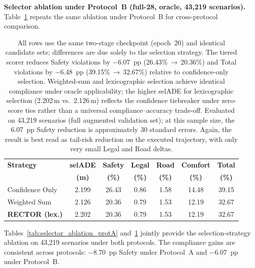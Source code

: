 \noindent\textbf{Selector ablation under Protocol~B (full-28, oracle, 43{,}219 scenarios).}
Table~\ref{tab:selector_ablation_protB} repeats the same ablation under Protocol~B for cross-protocol comparison.

\begin{table}[t]
\centering
\caption{Selector Ablation under Protocol~B (Full-28, Oracle, 43{,}219 Scenarios, Current Checkpoint)}
\label{tab:selector_ablation_protB}
\setlength{\tabcolsep}{3pt}
\begin{tabular}{lcccccc}
\toprule
\textbf{Strategy} & \textbf{selADE} & \textbf{Safety} & \textbf{Legal} & \textbf{Road} & \textbf{Comfort} & \textbf{Total} \\
 & \textbf{(m)} & \textbf{(\%)} & \textbf{(\%)} & \textbf{(\%)} & \textbf{(\%)} & \textbf{(\%)} \\
\midrule
Confidence Only & 2.199 & 26.43 & 0.86 & 1.58 & 14.48 & 39.15 \\
Weighted Sum & 2.126 & 20.36 & 0.79 & 1.53 & 12.19 & 32.67 \\
\textbf{RECTOR (lex.)} & 2.202 & 20.36 & 0.79 & 1.53 & 12.19 & 32.67 \\
\bottomrule
\end{tabular}
\vspace{1mm}
\caption*{\footnotesize All rows use the same two-stage checkpoint (epoch~20) and identical candidate sets; differences are due solely to the selection strategy.  The tiered scorer reduces Safety violations by $-$6.07~pp (26.43\%\,$\to$\,20.36\%) and Total violations by $-$6.48~pp (39.15\%\,$\to$\,32.67\%) relative to confidence-only selection.  Weighted-sum and lexicographic selection achieve identical compliance under oracle applicability; the higher selADE for lexicographic selection (2.202\,m vs.\ 2.126\,m) reflects the confidence tiebreaker under zero-score ties rather than a universal compliance--accuracy trade-off.  Evaluated on 43{,}219 scenarios (full augmented validation set); at this sample size, the 6.07~pp Safety reduction is approximately 30 standard errors.  Again, the result is best read as tail-risk reduction on the executed trajectory, with only very small Legal and Road deltas.}
\end{table}

Tables~\ref{tab:selector_ablation_protA} and~\ref{tab:selector_ablation_protB} jointly provide the selection-strategy ablation on 43{,}219 scenarios under both protocols.  The compliance gains are consistent across protocols: $-$8.70~pp Safety under Protocol~A and $-$6.07~pp under Protocol~B.

